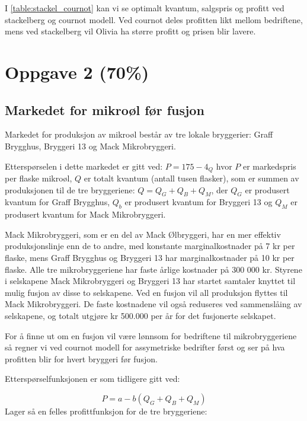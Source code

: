 \documentclass[
  12pt,
  a4paper,
  DIV=11,
  numbers=noendperiod]{scrartcl}
\begin{document}
I \autoref{table:stackel_cournot} kan vi se optimalt kvantum, salgspris
og profitt ved stackelberg og cournot modell. Ved cournot deles
profitten likt mellom bedriftene, mens ved stackelberg vil Olivia ha
større profitt og prisen blir lavere.

\clearpage

\section{Oppgave 2 (70\%)}\label{oppgave-2-70}

\subsection{Markedet for mikroøl før
fusjon}\label{markedet-for-mikrouxf8l-fuxf8r-fusjon}

Markedet for produksjon av mikroøl består av tre lokale bryggerier:
Graff Brygghus, Bryggeri 13 og Mack Mikrobryggeri.

Etterspørselen i dette markedet er gitt ved: \(P = 175 − 4_Q\) hvor
\(P\) er markedspris per flaske mikroøl, \(Q\) er totalt kvantum (antall
tusen flasker), som er summen av produksjonen til de tre bryggeriene:
\(Q = Q_G + Q_B + Q_M\), der \(Q_G\) er produsert kvantum for Graff
Brygghus, \(Q_b\) er produsert kvantum for Bryggeri 13 og \(Q_M\) er
produsert kvantum for Mack Mikrobryggeri.

Mack Mikrobryggeri, som er en del av Mack Ølbryggeri, har en mer
effektiv produksjonslinje enn de to andre, med konstante
marginalkostnader på 7 kr per flaske, mens Graff Brygghus og Bryggeri 13
har marginalkostnader på 10 kr per flaske. Alle tre mikrobryggeriene har
faste årlige kostnader på 300 000 kr. Styrene i selskapene Mack
Mikrobryggeri og Bryggeri 13 har startet samtaler knyttet til mulig
fusjon av disse to selskapene. Ved en fusjon vil all produksjon flyttes
til Mack Mikrobryggeri. De faste kostnadene vil også reduseres ved
sammenslåing av selskapene, og totalt utgjøre kr 500.000 per år for det
fusjonerte selskapet.

For å finne ut om en fusjon vil være lønnsom for bedriftene til
mikrobryggeriene så regner vi ved cournot modell for assymetriske
bedrifter først og ser på hva profitten blir for hvert bryggeri før
fusjon.

Etterspørselfunksjonen er som tidligere gitt ved:

\[P = a - b(Q_G+Q_B+Q_M) \tag{17}\] Lager så en felles profittfunksjon
for de tre bryggeriene:
\end{document}
